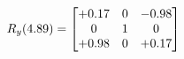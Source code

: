 \documentclass[preview]{standalone}
\begin{document}
\begin{align*}
\special{dvisvgm:raw <g id='unique000'>}R_{y}(4.89) = \begin{bmatrix}+0.17 & 0 & -0.98 \\0 & 1 & 0 \\+0.98 & 0 & +0.17\end{bmatrix}\special{dvisvgm:raw </g>}
\end{align*}
\end{document}
